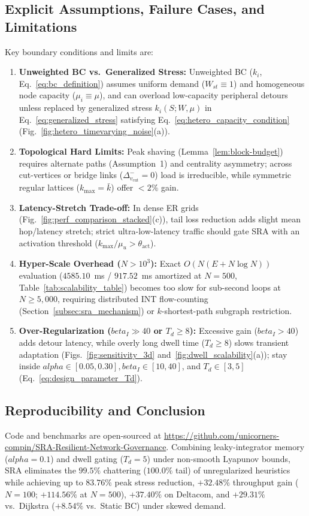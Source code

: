 \documentclass{ccjnl}
\newcommand{\rev}[1]{#1}
\def\rev#1{#1}%
\def\widetilde#1{#1}%
\def\kappa{k}%
\def\alpha{alpha}%
\def\beta{beta}%
\begin{document}
\rev{\subsection{Explicit Assumptions, Failure Cases, and Limitations}
\label{subsec:limitations}

Key boundary conditions and limits are:
\begin{enumerate}
    \item \textbf{Unweighted BC vs.\ Generalized Stress:} Unweighted BC ($\kappa_i$, Eq.~\eqref{eq:bc_definition}) assumes uniform demand ($W_{st} \equiv 1$) and homogeneous node capacity ($\mu_i \equiv \mu$), and can overload low-capacity peripheral detours unless replaced by generalized stress $\widetilde{\kappa}_i(S; W, \mu)$ in Eq.~\eqref{eq:generalized_stress} satisfying Eq.~\eqref{eq:hetero_capacity_condition} (Fig.~\ref{fig:hetero_timevarying_noise}(a)).
    \item \textbf{Topological Hard Limits:} Peak shaving (Lemma~\ref{lem:block-budget}) requires alternate paths (Assumption~1) and centrality asymmetry; across cut-vertices or bridge links ($\Delta_{v_{\text{cut}}}^- = 0$) load is irreducible, while symmetric regular lattices ($\kappa_{\max}=\bar{\kappa}$) offer $<2\%$ gain.
    \item \textbf{Latency-Stretch Trade-off:} In dense ER grids (Fig.~\ref{fig:perf_comparison_stacked}(c)), tail loss reduction adds slight mean hop/latency stretch; strict ultra-low-latency traffic should gate SRA with an activation threshold ($\kappa_{\max}/\mu_u > \theta_{\text{act}}$).
    \item \textbf{Hyper-Scale Overhead ($N > 10^3$):} Exact $O(N(E + N\log N))$ evaluation ($4585.10$~ms / $917.52$~ms amortized at $N=500$, Table~\ref{tab:scalability_table}) becomes too slow for sub-second loops at $N \ge 5{,}000$, requiring distributed INT flow-counting (Section~\ref{subsec:sra_mechanism}) or $k$-shortest-path subgraph restriction.
    \item \textbf{Over-Regularization ($\beta_I \gg 40$ or $T_d \ge 8$):} Excessive gain ($\beta_I > 40$) adds detour latency, while overly long dwell time ($T_d \ge 8$) slows transient adaptation (Figs.~\ref{fig:sensitivity_3d} and~\ref{fig:dwell_scalability}(a)); stay inside $\alpha \in [0.05, 0.30], \beta_I \in [10, 40]$, and $T_d \in [3, 5]$ (Eq.~\eqref{eq:design_parameter_Td}).
\end{enumerate}

\subsection{Reproducibility and Conclusion}
Code and benchmarks are open-sourced at \url{https://github.com/unicorners-compin/SRA-Resilient-Network-Governance}. Combining leaky-integrator memory ($\alpha=0.1$) and dwell gating ($T_d=5$) under non-smooth Lyapunov bounds, SRA eliminates the $99.5\%$ chattering ($100.0\%$ tail) of unregularized heuristics while achieving up to $83.76\%$ peak stress reduction, $+32.48\%$ throughput gain ($N=100$; $+114.56\%$ at $N=500$), $+37.40\%$ on Deltacom, and $+29.31\%$ vs.\ Dijkstra ($+8.54\%$ vs.\ Static BC) under skewed demand.}
\end{document}
